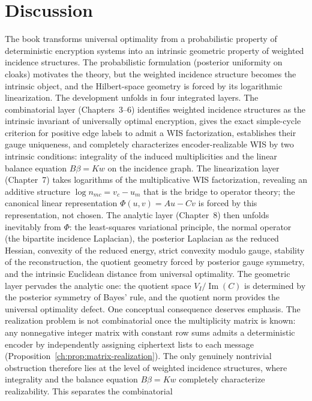﻿\chapter[Discussion]{Discussion}\label{ch:sec:discussion}
The book transforms universal optimality from a probabilistic property
of deterministic encryption systems into an intrinsic geometric
property of weighted incidence structures.  The probabilistic
formulation (posterior uniformity on cloaks) motivates the theory, but
the weighted incidence structure becomes the intrinsic object, and the
Hilbert-space geometry is forced by its logarithmic linearization.
The development unfolds in four integrated layers.  The combinatorial
layer (Chapters~3--6) identifies weighted incidence structures as the
intrinsic invariant of universally optimal encryption, gives the exact
simple-cycle criterion for positive edge labels to admit a WIS
factorization, establishes their gauge uniqueness, and completely
characterizes encoder-realizable
WIS by two intrinsic conditions: integrality of the induced
multiplicities and the linear balance equation $B\beta = K w$ on the
incidence graph.  The linearization layer (Chapter~7) takes logarithms
of the multiplicative WIS factorization, revealing an additive
structure $\log n_{mc}=v_c-u_m$ that is the bridge to operator theory;
the canonical linear representation $\Phi(u,v)=Au-Cv$ is forced by this
representation, not chosen.  The analytic layer (Chapter~8) then
unfolds inevitably from $\Phi$: the least-squares variational principle,
the normal operator (the bipartite incidence Laplacian), the posterior
Laplacian as the reduced Hessian, convexity of the reduced energy,
strict convexity modulo gauge, stability of the reconstruction, the
quotient geometry forced by posterior gauge symmetry, and the intrinsic
Euclidean distance from universal optimality.  The geometric layer pervades
the analytic one: the quotient space $V_I/\operatorname{Im}(C)$ is
determined by the posterior symmetry of Bayes' rule, and the quotient
norm provides the universal optimality defect.
One conceptual consequence deserves emphasis.  The realization problem
is not combinatorial once the multiplicity matrix is known: any
nonnegative integer matrix with constant row sums admits a deterministic
encoder by independently assigning ciphertext lists to each message
(Proposition~\ref{ch:prop:matrix-realization}).  The only genuinely
nontrivial obstruction therefore lies at the level of weighted incidence
structures, where integrality and the balance equation $B\beta=Kw$
completely characterize realizability.  This separates the combinatorial
